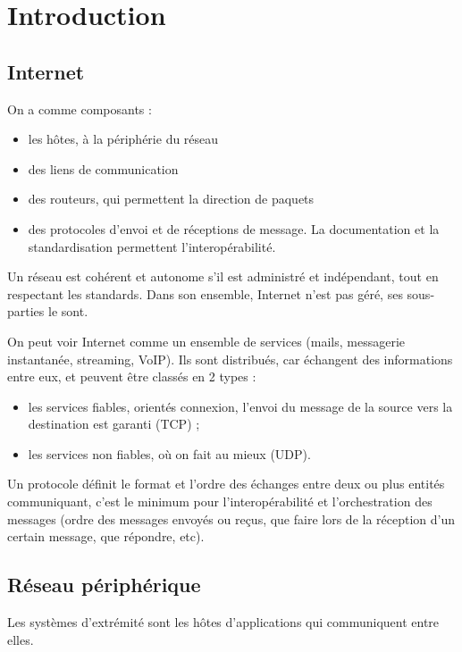 \chapter{Introduction}

\section{Internet}

On a comme composants :

\begin{itemize}
	\item les hôtes, à la périphérie du réseau
	\item des liens de communication
	\item des routeurs, qui permettent la direction de paquets
	\item des protocoles d'envoi et de réceptions de message. La documentation et la standardisation permettent l'interopérabilité.
\end{itemize}

Un réseau est cohérent et autonome s'il est administré et indépendant, tout en respectant les standards. Dans son ensemble, Internet n'est pas géré, ses sous-parties le sont.

On peut voir Internet comme un ensemble de services (mails, messagerie instantanée, streaming, VoIP). Ils sont distribués, car échangent des informations entre eux, et peuvent être classés en 2 types :

\begin{itemize}
	\item les services fiables, orientés connexion, l'envoi du message de la source vers la destination est garanti (TCP) ;
	\item les services non fiables, où on fait au mieux (UDP).
\end{itemize}

Un protocole définit le format et l'ordre des échanges entre deux ou plus entités communiquant, c'est le minimum pour l'interopérabilité et l'orchestration des messages (ordre des messages envoyés ou reçus, que faire lors de la réception d'un certain message, que répondre, etc).	

\section{Réseau périphérique}

Les systèmes d'extrémité sont les hôtes d'applications qui communiquent entre elles.	
	
